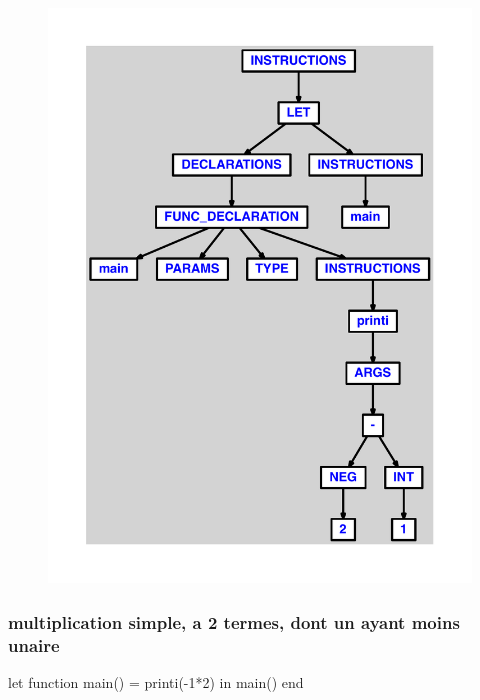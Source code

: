 \documentclass{article}
\begin{document}
\begin{figure}[H]\centering\includegraphics[max width=\textwidth]{ast/ast_64.pdf}\end{figure}\subsubsection{multiplication simple, a 2 termes, dont un ayant moins unaire}
\begin{verbatimtab}
let
	function main() = printi(-1*2)
in main() end
\end{verbatimtab}
\end{document}
